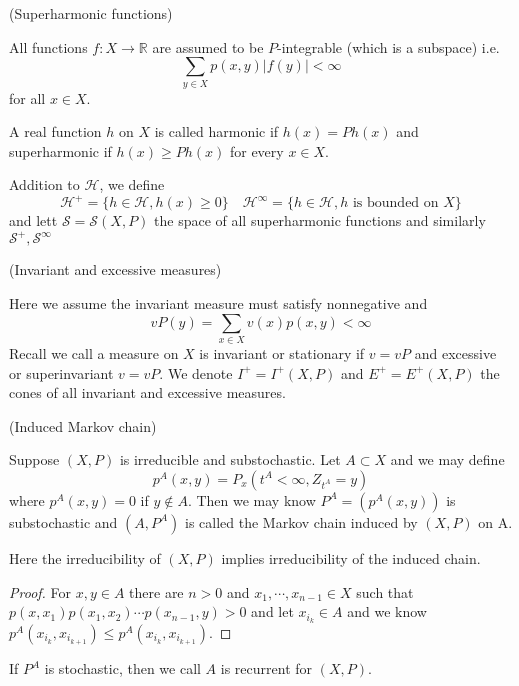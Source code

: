 \documentclass[lang=en,11pt,a4paper,citestyle =authoryear]{elegantpaper}
\newcommand{\R}{\mathbb{R}}
\newcommand{\Har}{\mathcal{H}}
\newcommand{\Sar}{\mathcal{S}}
\begin{document}
\begin{definition}
    (Superharmonic functions)\par
    All functions $f:X\to\R$ are assumed to be $P$-integrable (which is a subspace) i.e.
    \[
    \sum\limits_{y\in X}p(x,y)|f(y)| < \infty
    \]
    for all $x\in X$.\par
    A real function $h$ on $X$ is called harmonic if $h(x) = Ph(x)$ and superharmonic if $h(x) \geq Ph(x)$ for every $x\in X$.\par
    Addition to $\Har$, we define
    \[
    \Har^+ = \{h\in \Har, h(x)\geq 0\}\quad \Har^{\infty} = \{h \in \Har, h\text{ is bounded on }X\}
    \]
    and lett $\Sar = \Sar (X,P)$ the space of all superharmonic functions and similarly $\Sar^+,\Sar^{\infty}$
\end{definition}

\begin{definition}
    (Invariant and excessive measures)\par
    Here we assume the invariant measure must satisfy nonnegative and
    \[vP(y) = \sum\limits_{x\in X}v(x)p(x,y) < \infty\]
    Recall we call a measure on $X$ is invariant or stationary if $v= vP$ and excessive or superinvariant $v=vP$. We denote $I^+ = I^+(X,P)$ and $E^+ = E^+(X,P)$ the cones of all invariant and excessive measures.
\end{definition}

\begin{definition}
    (Induced Markov chain)\par
    Suppose $(X,P)$ is irreducible and substochastic. Let $A\subset X$ and we may define
    \[p^A(x,y) = P_x(t^A < \infty, Z_{t^A} = y)\]
    where $p^A(x,y) = 0$ if $y\notin A$. Then we may know $P^A = (p^A(x,y))$ is substochastic and $(A,P^A)$ is called the Markov chain induced by $(X,P)$ on A.\par
    Here the irreducibility of $(X,P)$ implies irreducibility of the induced chain.
\end{definition}
\begin{proof}
    For $x,y\in A$ there are $n>0$ and $x_1,\cdots,x_{n-1}\in X$ such that $p(x,x_1)p(x_1,x_2)\cdots p(x_{n-1},y) > 0$ and let $x_{i_k} \in A$ and we know $p^A(x_{i_k},x_{i_{k+1}}) \leq p^A(x_{i_k},x_{i_{k+1}})$.
\end{proof}

\begin{definition}
    If $P^A$ is stochastic, then we call $A$ is recurrent for $(X,P)$.
\end{definition}
\end{document}
